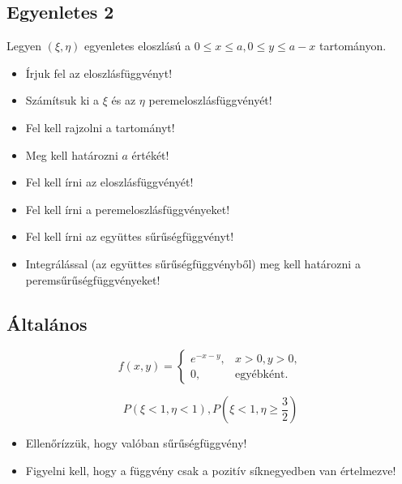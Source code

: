 \documentclass[a4paper]{article}
\newenvironment{solution}
{\color{RoyalBlue}}{\bigskip}
\begin{document}
\subsection{Egyenletes 2}

Legyen $(\xi, \eta)$ egyenletes eloszlású a $0 \leq x \leq a, 0 \leq y \leq a - x$ tartományon.

\begin{itemize}
\item Írjuk fel az eloszlásfüggvényt!
\item Számítsuk ki a $\xi$ és az $\eta$ peremeloszlásfüggvényét!
\end{itemize}

\begin{solution}
\begin{itemize}
\item Fel kell rajzolni a tartományt!
\item Meg kell határozni $a$ értékét!
\item Fel kell írni az eloszlásfüggvényét!
\item Fel kell írni a peremeloszlásfüggvényeket!
\item Fel kell írni az együttes sűrűségfüggvényt!
\item Integrálással (az együttes sűrűségfüggvényből) meg kell határozni a peremsűrűségfüggvényeket!
\end{itemize}
\end{solution}

\subsection{Általános}

\[
f(x, y) = \begin{cases}
e^{-x-y}, & x > 0, y > 0, \\
0, & \text{egyébként}.
\end{cases}
\]

\[
P(\xi < 1, \eta < 1), P\left(\xi < 1, \eta \geq \dfrac{3}{2}\right)
\]


\begin{solution}
\begin{itemize}
\item Ellenőrízzük, hogy valóban sűrűségfüggvény!
\item Figyelni kell, hogy a függvény csak a pozitív síknegyedben van értelmezve!
\end{itemize}
\end{solution}
\end{document}
